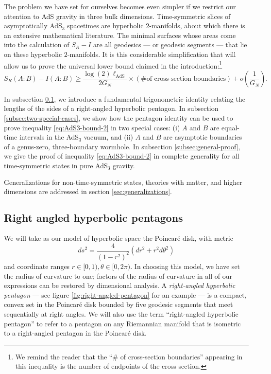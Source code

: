 \documentclass[a4paper,11pt]{article}
\begin{document}
The problem we have set for ourselves becomes even simpler if we restrict our attention to AdS gravity in three bulk dimensions. Time-symmetric slices of asymptotically AdS$_3$ spacetimes are hyperbolic $2$-manifolds, about which there is an extensive mathematical literature. The minimal surfaces whose areas come into the calculation of $S_R - I$ are all geodesics --- or geodesic segments --- that lie on these hyperbolic $2$-manifolds. It is this considerable simplification that will allow us to prove the universal lower bound claimed in the introduction:\footnote{We remind the reader that the ``\# of cross-section boundaries'' appearing in this inequality is the number of endpoints of the cross section.}
\begin{equation} \label{eq:AdS3-bound-2}
    S_R(A:B) - I(A:B) \geq \frac{\log(2) \ell_{\text{AdS}}}{2 G_N} \times (\text{\# of cross-section boundaries}) + o\left(\frac{1}{G_N}\right).
\end{equation}

In subsection \ref{subsec:pentagons}, we introduce a fundamental trigonometric identity relating the lengths of the sides of a right-angled hyperbolic pentagon. In subsection \ref{subsec:two-special-cases}, we show how the pentagon identity can be used to prove inequality \eqref{eq:AdS3-bound-2} in two special cases: (i) $A$ and $B$ are equal-time intervals in the AdS$_3$ vacuum, and (ii) $A$ and $B$ are asymptotic boundaries of a genus-zero, three-boundary wormhole. In subsection \ref{subsec:general-proof}, we give the proof of inequality \eqref{eq:AdS3-bound-2} in complete generality for all time-symmetric states in pure AdS$_3$ gravity.

Generalizations for non-time-symmetric states, theories with matter, and higher dimensions are addressed in section \ref{sec:generalizations}.

\subsection{Right angled hyperbolic pentagons}
\label{subsec:pentagons}

We will take as our model of hyperbolic space the Poincar\'{e} disk, with metric
\begin{equation} \label{eq:poincare-disk}
    ds^2 = \frac{4}{(1-r^2)^2} \left( dr^2 + r^2 d\theta^2 \right)
\end{equation}
and coordinate ranges $r \in [0, 1), \theta \in [0, 2 \pi).$ In choosing this model, we have set the radius of curvature to one; factors of the radius of curvature in all of our expressions can be restored by dimensional analysis. A \emph{right-angled hyperbolic pentagon} --- see figure \ref{fig:right-angled-pentagon} for an example --- is a compact, convex set in the Poincar\'{e} disk bounded by five geodesic segments that meet sequentially at right angles. We will also use the term ``right-angled hyperbolic pentagon'' to refer to a pentagon on any Riemannian manifold that is isometric to a right-angled pentagon in the Poincar\'{e} disk.
\end{document}
